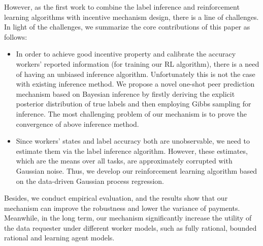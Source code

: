 However, as the first work to combine the label inference and reinforcement learning algorithms with incentive mechanism design, there is a line of challenges. In light of the challenges, we summarize the core contributions of this paper as follows:
\begin{itemize}
\item In order to achieve good incentive property and calibrate the accuracy workers' reported information (for training our RL algorithm), there is a need of having an unbiased inference algorithm. Unfortunately this is not the case with existing inference method. We propose a novel one-shot peer prediction mechanism based on Bayesian inference by firstly deriving the explicit posterior distribution of true labels and then employing Gibbs sampling for inference. The most challenging problem of our mechanism is to prove the convergence of above inference method.
\item Since workers' states and label accuracy both are unobservable, we need to estimate them via the label inference algorithm. However, these estimates, which are the means over all tasks, are approximately corrupted with Gaussian noise. Thus, we develop our reinforcement learning algorithm based on the data-driven Gaussian process regression.
\end{itemize}
Besides, we conduct empirical evaluation, and the results show that our mechanism can improve the robustness and lower the variance of payments. Meanwhile, in the long term, our mechanism significantly increase the utility of the data requester under different worker models, such as fully rational, bounded rational and learning agent models. 

